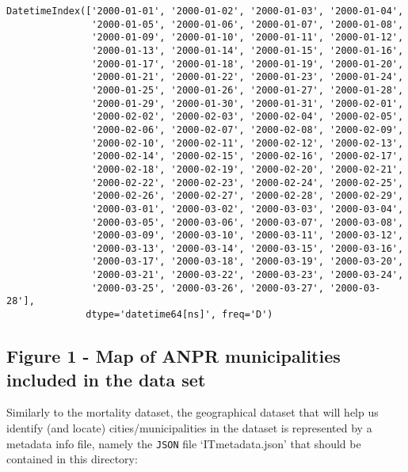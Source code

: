 \documentclass[11pt]{article}
\begin{document}
    \begin{Verbatim}[commandchars=\\\{\}]
DatetimeIndex(['2000-01-01', '2000-01-02', '2000-01-03', '2000-01-04',
               '2000-01-05', '2000-01-06', '2000-01-07', '2000-01-08',
               '2000-01-09', '2000-01-10', '2000-01-11', '2000-01-12',
               '2000-01-13', '2000-01-14', '2000-01-15', '2000-01-16',
               '2000-01-17', '2000-01-18', '2000-01-19', '2000-01-20',
               '2000-01-21', '2000-01-22', '2000-01-23', '2000-01-24',
               '2000-01-25', '2000-01-26', '2000-01-27', '2000-01-28',
               '2000-01-29', '2000-01-30', '2000-01-31', '2000-02-01',
               '2000-02-02', '2000-02-03', '2000-02-04', '2000-02-05',
               '2000-02-06', '2000-02-07', '2000-02-08', '2000-02-09',
               '2000-02-10', '2000-02-11', '2000-02-12', '2000-02-13',
               '2000-02-14', '2000-02-15', '2000-02-16', '2000-02-17',
               '2000-02-18', '2000-02-19', '2000-02-20', '2000-02-21',
               '2000-02-22', '2000-02-23', '2000-02-24', '2000-02-25',
               '2000-02-26', '2000-02-27', '2000-02-28', '2000-02-29',
               '2000-03-01', '2000-03-02', '2000-03-03', '2000-03-04',
               '2000-03-05', '2000-03-06', '2000-03-07', '2000-03-08',
               '2000-03-09', '2000-03-10', '2000-03-11', '2000-03-12',
               '2000-03-13', '2000-03-14', '2000-03-15', '2000-03-16',
               '2000-03-17', '2000-03-18', '2000-03-19', '2000-03-20',
               '2000-03-21', '2000-03-22', '2000-03-23', '2000-03-24',
               '2000-03-25', '2000-03-26', '2000-03-27', '2000-03-28'],
              dtype='datetime64[ns]', freq='D')
    \end{Verbatim}

    \hypertarget{figure-1---map-of-anpr-municipalities-included-in-the-data-set}{%
\subsection{Figure 1 - Map of ANPR municipalities included in the
data
set}\label{figure-1---map-of-anpr-municipalities-included-in-the-data-set}}

    Similarly to the mortality dataset, the geographical dataset that will
help us identify (and locate) cities/municipalities in the dataset is
represented by a metadata info file, namely the \texttt{JSON} file
`ITmetadata.json' that should be contained in this directory:
\end{document}
